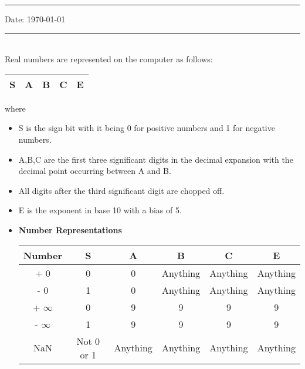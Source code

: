 \documentclass[letterpaper]{exam}
\begin{document}
\hrule
\vspace{3mm}
\noindent 
\vspace{3mm}

\noindent
{{\sf Date: \today }} %



\vspace{3mm}
\hrule
\begin{questions}
\\
Real numbers are represented on the computer as follows:\\
\begin{center}
\begin{tabular}{|c|c|c|c|c|}
\hline
     \huge{\color{red}S}&\huge{\color{green}A}&\huge{\color{green}B}&\huge{\color{green}C}&\huge{\color{yellow}E}  \\[0.5ex]
\hline
\end{tabular}
\end{center}
where
\begin{itemize}
    \item {\color{red}S} is the sign bit with it being 0 for positive numbers and 1 for negative numbers.
    \item {\color{green}A,B,C} are the first three significant digits in the decimal expansion with the decimal point occurring between {\color{green}A} and {\color{green}B}.
    \item All digits after the third significant digit are chopped off.
    \item {\color{yellow}E} is the exponent in base 10 with a bias of 5.
    \item \textbf{Number Representations}
    \begin{center}
        \begin{tabular}{|c|c|c|c|c|c|}
        \hline
        \LARGE{Number}&\huge{\color{red}S}&\huge{\color{green}A}&\huge{\color{green}B}&\huge{\color{green}C}&\huge{\color{yellow}E}  \\[0.5ex]
        \hline
         + 0&0&0&Anything&Anything&Anything \\[0.5ex]
        \hline
        - 0&1&0&Anything&Anything&Anything \\[0.5ex]
        \hline
        + $\infty$&0&9&9&9&9 \\[0.5ex]
        \hline
        - $\infty$&1&9&9&9&9 \\[0.5ex]
        \hline
        NaN&Not 0 or 1&Anything&Anything&Anything&Anything \\[0.5ex]
        \hline
        \end{tabular}
    \end{center}
\end{itemize}


\end{questions}
\end{document}
